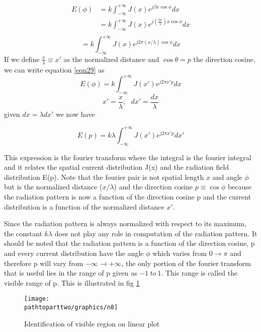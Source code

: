 \begin{align*}
E(\phi) &= k\int_{-\infty}^{+\infty}J(x) e^{j\beta x \cos\phi}dx \\
&= k\int_{-\infty}^{+\infty}J(x) e^{j(\frac{2\pi}{\lambda}) x \cos\phi}dx\\
\end{align*}
\begin{equation}
=k\int_{-\infty}^{+\infty}J(x) e^{j2\pi(x/\lambda)  \cos\phi}dx
\label{eqn29}
\end{equation}
If we define $\frac{x}{\lambda} \equiv x'$ as the normalized distance and $\cos\theta = p$ 
the direction cosine, we can write equation \ref{eqn29} as 
$$E(\phi) = k\int_{-\infty}^{+\infty}J(x') e^{j2\pi x' p }dx$$
$$ x' = \frac{x}{\lambda}; \ \ \ dx' = \frac{dx}{\lambda}$$
given $dx = \lambda dx'$ we now have

\begin{equation}
E(p) = k\lambda\int_{-\infty}^{+\infty}J(x') e^{j2\pi x' p}dx'
\label{eqn30}	
\end{equation}

This expression is the fourier transform where  the integral is the fourier integral and it relates the spatial current distribution J(x) and the radiation field distribution E(p). Note that the fourier pair is not spatial length $x$ and angle  $\phi$ but is the normalized distance  ($x/\lambda$) and the direction cosine $ p \equiv \cos\phi$ because the radiation pattern is now a function of the direction cosine p and the current distribution is a function of the normalized distance $x'$.

Since the radiation pattern is always normalized with respect to its maximum, the constant $k\lambda$ does not play any role in computation of the radiation pattern. It should be noted that the radiation pattern is a function of the direction cosine, p and every current distribution have the angle $\phi$ which varies from $0\to\pi$ and therefore p will vary from $-\infty\to +\infty$, the only portion of the fourier transform that is useful lies in the range of p given as $-1 \ to\ 1$. This range is called the visible range of p. This is illustrated in fig \ref{fig:8}
\begin{figure}[h]
\centering
\texttt{[image: \\pathtoparttwo/graphics/n8]}
\caption{Identification of visible region on linear plot}
\label{fig:8}
\end{figure}

